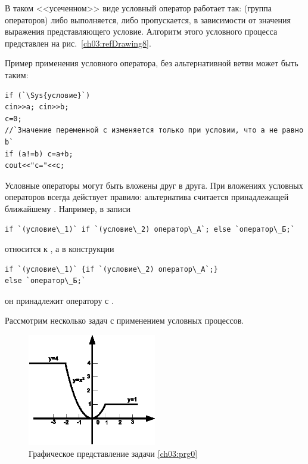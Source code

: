 В таком <<усеченном>> виде условный оператор работает так:  (группа операторов) либо
выполняется, либо пропускается, в зависимости от значения выражения представляющего условие. Алгоритм этого условного
процесса представлен на рис.~\ref{ch03:refDrawing8}.



Пример применения условного оператора, без альтернативной ветви  может быть таким:

\begin{lstlisting}
if (`\Sys{условие}`)
cin>>a; cin>>b;
c=0;
//`Значение переменной c изменяется только при условии, что a не равно b`
if (a!=b) c=a+b;
cout<<"c="<<c;
\end{lstlisting}

Условные операторы могут быть вложены друг в друга. При вложениях условных операторов всегда действует правило:
альтернатива  считается принадлежащей ближайшему . Например, в записи
\begin{lstlisting}
if `(условие\_1)` if `(условие\_2) оператор\_А`; else `оператор\_Б;`
\end{lstlisting}
 относится к , а в конструкции
\begin{lstlisting}
if `(условие\_1)` {if `(условие\_2) оператор\_А`;} 
else `оператор\_Б;`
\end{lstlisting}
он принадлежит оператору  с . 

Рассмотрим несколько задач с применением условных процессов.


\begin{figure}[htb]
\begin{center}
\includegraphics[width=0.5\textwidth]{img/ris_3_10}
\caption{Графическое представление задачи \ref{ch03:prg0}}
\label{ch03:refDrawing9}
\end{center}
\end{figure}

